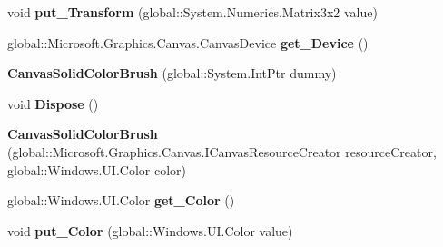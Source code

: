 \begin{DoxyCompactItemize}
void {\bfseries put\+\_\+\+Transform} (global\+::\+System.\+Numerics.\+Matrix3x2 value)
\item 
\mbox{\label{class_microsoft_1_1_graphics_1_1_canvas_1_1_brushes_1_1_canvas_solid_color_brush_a9b921bed44082b56dc498621035b25f9}} 
global\+::\+Microsoft.\+Graphics.\+Canvas.\+Canvas\+Device {\bfseries get\+\_\+\+Device} ()
\item 
\mbox{\label{class_microsoft_1_1_graphics_1_1_canvas_1_1_brushes_1_1_canvas_solid_color_brush_a7e4a9e90a6cd5e8ff75d6b8b37409b35}} 
{\bfseries Canvas\+Solid\+Color\+Brush} (global\+::\+System.\+Int\+Ptr dummy)
\item 
\mbox{\label{class_microsoft_1_1_graphics_1_1_canvas_1_1_brushes_1_1_canvas_solid_color_brush_a46f1e2e21dc08f8da7c1a89fd59311fc}} 
void {\bfseries Dispose} ()
\item 
\mbox{\label{class_microsoft_1_1_graphics_1_1_canvas_1_1_brushes_1_1_canvas_solid_color_brush_a6a9cfff8962b0007c46d54d3d60cd93f}} 
{\bfseries Canvas\+Solid\+Color\+Brush} (global\+::\+Microsoft.\+Graphics.\+Canvas.\+I\+Canvas\+Resource\+Creator resource\+Creator, global\+::\+Windows.\+U\+I.\+Color color)
\item 
\mbox{\label{class_microsoft_1_1_graphics_1_1_canvas_1_1_brushes_1_1_canvas_solid_color_brush_ac3b79256cdb5b26bcce81d701c5d722a}} 
global\+::\+Windows.\+U\+I.\+Color {\bfseries get\+\_\+\+Color} ()
\item 
\mbox{\label{class_microsoft_1_1_graphics_1_1_canvas_1_1_brushes_1_1_canvas_solid_color_brush_aa06a0ab02b8270177161c16f123f8c50}} 
void {\bfseries put\+\_\+\+Color} (global\+::\+Windows.\+U\+I.\+Color value)
\item 
\mbox{\label{class_microsoft_1_1_graphics_1_1_canvas_1_1_brushes_1_1_canvas_solid_color_brush_a9bcb646ebe3917306b5c7b2ce19e680c}} 

\end{DoxyCompactItemize}
